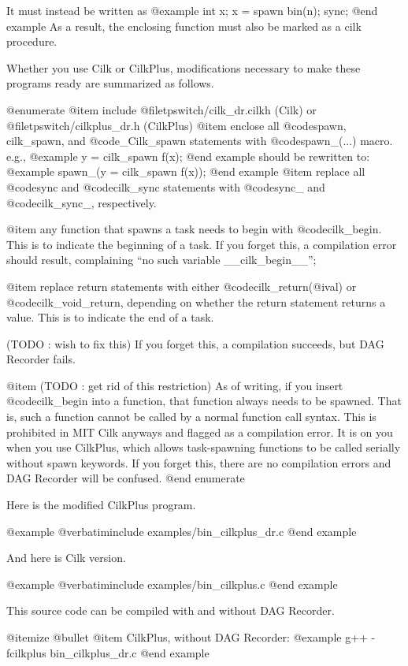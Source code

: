 It must instead be written as
@example
int x;
x = spawn bin(n);
sync;
@end example
As a result, the enclosing function must also be marked as a cilk procedure.


Whether you use Cilk or CilkPlus, modifications necessary to make these
programs ready are summarized as follows.

@enumerate
@item include @file{tpswitch/cilk_dr.cilkh} (Cilk) or @file{tpswitch/cilkplus_dr.h} (CilkPlus)
@item enclose all @code{spawn, cilk_spawn,} and @code{_Cilk_spawn} statements with @code{spawn_(...)} macro.  e.g.,
@example
y = cilk_spawn f(x);
@end example
should be rewritten to:
@example
spawn_(y = cilk_spawn f(x));
@end example
@item replace all @code{sync} and @code{cilk_sync} statements with @code{sync_} and @code{cilk_sync_}, respectively.

@item any function that spawns a task needs to begin with @code{cilk_begin}.  This is to indicate the beginning of a task.  If you forget this, a compilation error should result, complaining ``no such variable __cilk_begin__'';

@item replace return statements with either @code{cilk_return(@i{val})} or @code{cilk_void_return}, depending on whether the return statement returns a value.  This is to indicate the end of a task.  

      (TODO : wish to fix this) If you forget this, a compilation
      succeeds, but DAG Recorder fails.

@item (TODO : get rid of this restriction) As of writing, if you insert @code{cilk_begin}
      into a function, that function always needs to be spawned. That is,
      such a function cannot be called by a normal function call syntax.  
      This is prohibited in MIT Cilk
      anyways and flagged as a compilation error.  It is on you when
      you use CilkPlus, which allows task-spawning functions to be
      called serially without spawn keywords.  If you forget this, there
      are no compilation errors and DAG Recorder will be confused.
@end enumerate

Here is the modified CilkPlus program.

@example
@verbatiminclude examples/bin_cilkplus_dr.c
@end example

And here is Cilk version.

@example
@verbatiminclude examples/bin_cilkplus.c
@end example

This source code can be compiled with and without DAG Recorder.

@itemize @bullet
@item CilkPlus, without DAG Recorder:
@example
g++ -fcilkplus bin_cilkplus_dr.c
@end example

